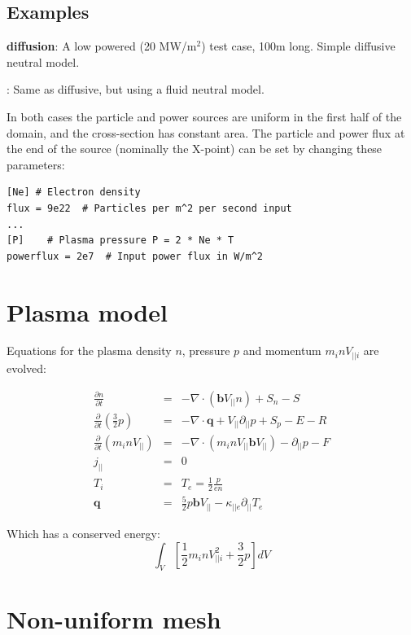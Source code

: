 \documentclass[12pt,a4paper]{article}
\newcommand{\bvec}{\mathbf{b}}
\begin{document}
\subsection{Examples}

{\bf diffusion}: A low powered (20 MW/m$^2$) test case, 100m long. Simple diffusive neutral model.

: Same as diffusive, but using a fluid neutral model.

In both cases the particle and power sources are uniform in the first half of the domain, and the cross-section has constant area.
The particle and power flux at the end of the source (nominally the X-point) can be set by changing these parameters:
\begin{verbatim}
[Ne] # Electron density 
flux = 9e22  # Particles per m^2 per second input
...
[P]    # Plasma pressure P = 2 * Ne * T
powerflux = 2e7  # Input power flux in W/m^2
\end{verbatim}

\section{Plasma model}

Equations for the plasma density $n$, pressure $p$ and momentum $m_inV_{||i}$ are evolved:

\begin{eqnarray*}
  \frac{\partial n}{\partial t} &=& - \nabla\cdot\left( \bvec V_{||} n\right) + S_n - S\\
  \frac{\partial}{\partial t}\left(\frac{3}{2}p\right) &=& -\nabla\cdot\mathbf{q} + V_{||}\partial_{||}p + S_p - E - R \\
  \frac{\partial}{\partial t}\left(m_i nV_{||}\right) &=& -\nabla\cdot\left(m_inV_{||}\bvec V_{||}\right) - \partial_{||} p - F\\
  j_{||} &=& 0 \\
  T_i &=& T_e = \frac{1}{2}\frac{p}{en} \\
  \mathbf{q} &=& \frac{5}{2}p\bvec V_{||} - \kappa_{||e}\partial_{||}T_e
\end{eqnarray*}

Which has a conserved energy:
\[
\int_V \left[ \frac{1}{2}m_inV_{||i}^2 + \frac{3}{2}p \right] dV
\]

\section{Non-uniform mesh}
\end{document}
